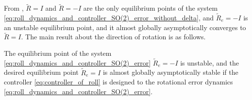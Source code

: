 From \cite{rodriguez-cortesNewGeometricTrajectory2022}, $ \tilde{R} = I $ and $ \tilde{R} = - I $ are the only equilibrium points of the system \eqref{eq:roll_dynamics_and_controller_SO(2)_error_without_delta}, and $ \tilde{R}_e = -I $ is an unstable equilibrium point, and it almost globally asymptotically converges to $ \tilde{R} = I $.
The main result about the direction of rotation is as follows.

\begin{theorem}
    \label{theorem:1}
    The equilibrium point of the system \eqref{eq:roll_dynamics_and_controller_SO(2)_error} $ \tilde{R}_e = -I $ is unstable, and the desired equilibrium point $ \tilde{R}_e = I $ is almost globally asymptotically stable if the controller \eqref{eq:controller_of_roll} is designed to the rotational error dynamics \eqref{eq:roll_dynamics_and_controller_SO(2)_error}.
\end{theorem}

